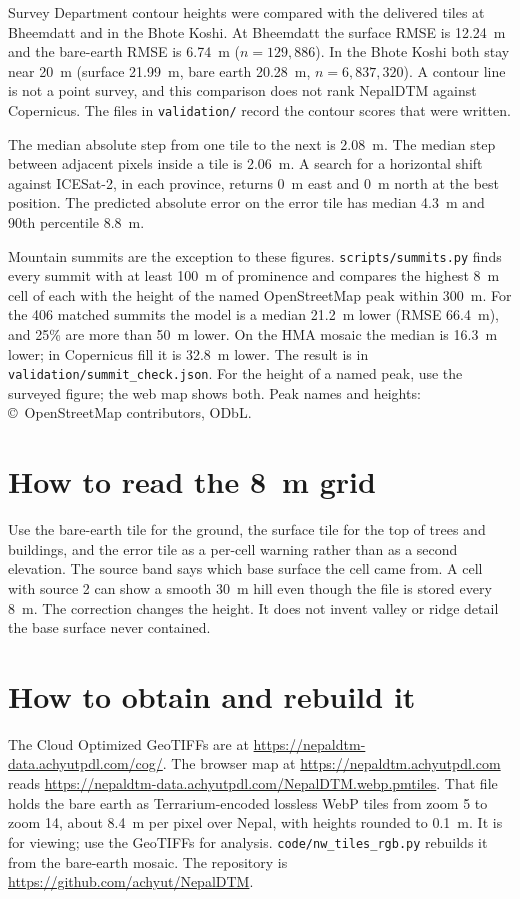 \documentclass[11pt]{article}
\begin{document}
Survey Department contour heights were compared with the delivered tiles at Bheemdatt and in the Bhote Koshi.
At Bheemdatt the surface RMSE is 12.24~m and the bare-earth RMSE is 6.74~m ($n=129{,}886$).
In the Bhote Koshi both stay near 20~m (surface 21.99~m, bare earth 20.28~m, $n=6{,}837{,}320$).
A contour line is not a point survey, and this comparison does not rank NepalDTM against Copernicus.
The files in \texttt{validation/} record the contour scores that were written.

The median absolute step from one tile to the next is 2.08~m.
The median step between adjacent pixels inside a tile is 2.06~m.
A search for a horizontal shift against ICESat-2, in each province, returns 0~m east and 0~m north at the best position.
The predicted absolute error on the error tile has median 4.3~m and 90th percentile 8.8~m.

Mountain summits are the exception to these figures.
\texttt{scripts/summits.py} finds every summit with at least 100~m of prominence and compares the highest 8~m cell of each with the height of the named OpenStreetMap peak within 300~m.
For the 406 matched summits the model is a median 21.2~m lower (RMSE 66.4~m), and 25\% are more than 50~m lower.
On the HMA mosaic the median is 16.3~m lower; in Copernicus fill it is 32.8~m lower.
The result is in \texttt{validation/summit\_check.json}.
For the height of a named peak, use the surveyed figure; the web map shows both.
Peak names and heights: \copyright~OpenStreetMap contributors, ODbL.

\section{How to read the 8~m grid}

Use the bare-earth tile for the ground, the surface tile for the top of trees and buildings, and the error tile as a per-cell warning rather than as a second elevation.
The source band says which base surface the cell came from.
A cell with source 2 can show a smooth 30~m hill even though the file is stored every 8~m.
The correction changes the height.
It does not invent valley or ridge detail the base surface never contained.

\section{How to obtain and rebuild it}

The Cloud Optimized GeoTIFFs are at
\url{https://nepaldtm-data.achyutpdl.com/cog/}.
The browser map at \url{https://nepaldtm.achyutpdl.com} reads
\url{https://nepaldtm-data.achyutpdl.com/NepalDTM.webp.pmtiles}.
That file holds the bare earth as Terrarium-encoded lossless WebP tiles from zoom 5 to zoom 14, about 8.4~m per pixel over Nepal, with heights rounded to 0.1~m.
It is for viewing; use the GeoTIFFs for analysis.
\texttt{code/nw\_tiles\_rgb.py} rebuilds it from the bare-earth mosaic.
The repository is \url{https://github.com/achyut/NepalDTM}.
\end{document}
